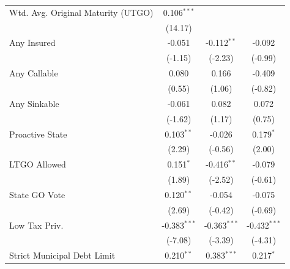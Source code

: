 \begin{tabular*}{\textwidth}{@{\extracolsep{\fill}}lccc}
   Wtd. Avg. Original Maturity (UTGO) & 0.106$^{***}$                 &                               &   \\   
                                      & (14.17)                      &                               &   \\   
   Any Insured                        & -0.051                        & -0.112$^{**}$                 & -0.092\\   
                                      & (-1.15)                      & (-2.23)                      & (-0.99)\\   
   Any Callable                       & 0.080                         & 0.166                         & -0.409\\   
                                      & (0.55)                       & (1.06)                       & (-0.82)\\   
   Any Sinkable                       & -0.061                        & 0.082                         & 0.072\\   
                                      & (-1.62)                      & (1.17)                       & (0.75)\\   
   Proactive State                    & 0.103$^{**}$                  & -0.026                        & 0.179$^{*}$\\   
                                      & (2.29)                       & (-0.56)                      & (2.00)\\   
   LTGO Allowed                       & 0.151$^{*}$                   & -0.416$^{**}$                 & -0.079\\   
                                      & (1.89)                       & (-2.52)                      & (-0.61)\\   
   State GO Vote                      & 0.120$^{**}$                  & -0.054                        & -0.075\\   
                                      & (2.69)                       & (-0.42)                      & (-0.69)\\   
   Low Tax Priv.                      & -0.383$^{***}$                & -0.363$^{***}$                & -0.432$^{***}$\\   
                                      & (-7.08)                      & (-3.39)                      & (-4.31)\\   
   Strict Municipal Debt Limit        & 0.210$^{**}$                  & 0.383$^{***}$                 & 0.217$^{*}$\\   

\end{tabular*}
